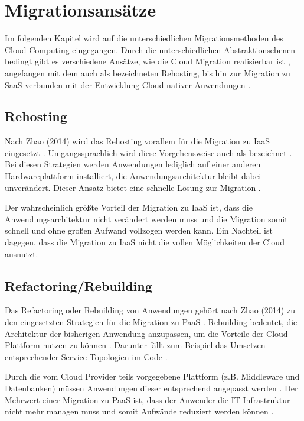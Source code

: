\section{Migrationsansätze}
\label{sec:migrationsansaetze}


Im folgenden Kapitel wird auf die unterschiedlichen Migrationsmethoden des Cloud Computing eingegangen. Durch die unterschiedlichen Abstraktionsebenen bedingt gibt es verschiedene Ansätze, wie die Cloud Migration realisierbar ist \cite[Vgl.][S. 226]{Surianarayanan2019}, angefangen mit dem auch als \grqq{} bezeichneten Rehosting, bis hin zur Migration zu \ac{SaaS} verbunden mit der Entwicklung Cloud nativer Anwendungen \cite[Vgl.][S. 144]{Zhao2014}.

\subsection{Rehosting}
Nach Zhao (2014) wird das Rehosting vorallem für die Migration zu \ac{IaaS} eingesetzt \cite[Vgl.][S. 144]{Zhao2014}. Umgangssprachlich wird diese Vorgehensweise auch als \grqq{} bezeichnet \cite[Vgl.][]{NetApp}. Bei diesen Strategien werden Anwendungen lediglich auf einer anderen Hardwareplattform installiert, die Anwendungsarchitektur bleibt dabei unverändert. Dieser Ansatz bietet eine schnelle Lösung zur Migration \cite[Vgl.][]{CIO}.

Der wahrscheinlich größte Vorteil der Migration zu \ac{IaaS} ist, dass die Anwendungsarchitektur nicht verändert werden muss und die Migration somit schnell und ohne großen Aufwand vollzogen werden kann. Ein Nachteil ist dagegen, dass die Migration zu \ac{IaaS} nicht die vollen Möglichkeiten der Cloud ausnutzt.

\subsection{Refactoring/Rebuilding}
Das Refactoring oder Rebuilding von Anwendungen gehört nach Zhao (2014) zu den eingesetzten Strategien für die Migration zu \ac{PaaS} \cite[Vgl.][S. 144]{Zhao2014}. Rebuilding bedeutet, die Architektur der bisherigen Anwendung anzupassen, um die Vorteile der Cloud Plattform nutzen zu können \cite[Vgl.][]{CIO}. Darunter fällt zum Beispiel das Umsetzen entsprechender Service Topologien im Code \cite[Vgl.][S. 2]{Holmes2018}.

Durch die vom Cloud Provider teils vorgegebene Plattform (z.B. Middleware und Datenbanken) müssen Anwendungen dieser entsprechend angepasst werden \cite[Vgl.][S. 227]{Surianarayanan2019}. Der Mehrwert einer Migration zu \ac{PaaS} ist, dass der Anwender die IT-Infrastruktur nicht mehr managen muss und somit Aufwände reduziert werden können \cite[Vgl.][S. 6]{Pahl}.

